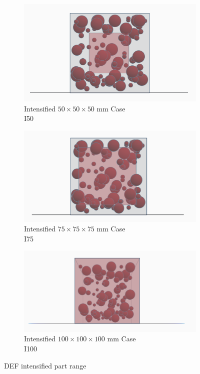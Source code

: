 \begin{figure}[!ht]
\centering
    \begin{subfigure}{.33\textwidth}
      \centering
      \includegraphics[width=.8\linewidth]{Files/DEF_X/X0_3ds.png}
      \caption{Intensified $50 \times 50 \times 50$ mm Case\\ I50}
    \end{subfigure}%
    \begin{subfigure}{.33\textwidth}
      \centering
      \includegraphics[width=.8\linewidth]{Files/DEF_X/X-5_3ds.png}
      \caption{Intensified $75 \times 75 \times 75$ mm Case \\ I75}
    \end{subfigure}%
    \begin{subfigure}{.33\textwidth}
      \centering
      \includegraphics[width=.9\linewidth]{Files/DEF_X/X-1_3ds.png}
      \caption{Intensified $100 \times 100 \times 100$ mm Case\\ I100}
    \end{subfigure}
  \caption{DEF intensified part range}
  \label{rangeagain}
\end{figure}

